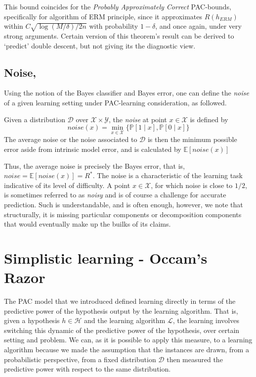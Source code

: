 This bound coincides for the \textit{Probably Approximately Correct} PAC-bounds, specifically for algorithm of ERM principle, since it approximates $R(h_{ERM})$ within $C\sqrt{\log{(M/\delta)}/2n}$ with probability $1-\delta$, and once again, under very strong arguments. Certain version of this theorem's result can be derived to `predict' double descent, but not giving its the diagnostic view. 
\subsection{Noise, \cite{10.5555/2371238}}

Using the notion of the Bayes classifier and Bayes error, one can define the \textit{noise}  of a given learning setting under PAC-learning consideration, as followed. 
\begin{definition}[Noise]
    Given a distribution $\mathcal{D}$ over $\mathcal{X}\times \mathcal{Y}$, the \textit{noise} at point $x\in \mathcal{X}$ is defined by \begin{equation*}
        noise(x) = \min_{x\in \mathcal{X}} \{\mathbb{P}[1\mid x], \mathbb{P}[0\mid x]\}
    \end{equation*}
    The average noise or the noise associated to $\mathcal{D}$ is then the minimum possible error aside from intrinsic model error, and is calculated by $\mathbb{E}[noise(x)]$
\end{definition}
Thus, the average noise is precisely the Bayes error, that is, $noise = \mathbb{E}[noise(x)]=R^{*}$. The noise is a characteristic of the learning task indicative of its level of difficulty. A point $x\in \mathcal{X}$, for which noise is close to $1/2$, is sometimes referred to as \textit{noisy} and is of course a challenge for accurate prediction. Such is understandable, and is often enough, however, we note that structurally, it is missing particular components or decomposition components that would eventually make up the builks of its claims. 

\section{Simplistic learning - Occam's Razor}

The PAC model that we introduced defined learning directly in terms of the predictive power of the hypothesis output by the learning algorithm. That is, given a hypothesis $h\in \mathcal{H}$ and the learning algorithm $\mathcal{L}$, the learning involves switching this dynamic of the predictive power of the hypothesis, over certain setting and problem. We can, as it is possible to apply this measure, to a learning algorithm because we made the assumption that the instances are drawn, from a probabilistic perspective, from a fixed distribution $\mathcal{D}$ then measured the predictive power with respect to the same distribution. 

